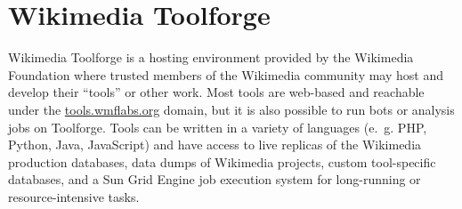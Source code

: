 \section{Wikimedia Toolforge}
\label{sec:Background:Toolforge}


Wikimedia Toolforge is a hosting environment provided by the Wikimedia Foundation
where trusted members of the Wikimedia community may host and develop their “tools” or other work.
Most tools are web-based and reachable under the \href{https://tools.wmflabs.org/}{tools.wmflabs.org} domain,
but it is also possible to run bots or analysis jobs on Toolforge.
Tools can be written in a variety of languages
(e.~g. PHP, Python, Java, JavaScript)
and have access to live replicas of the Wikimedia production databases,
data dumps of Wikimedia projects,
custom tool-specific databases,
and a Sun Grid Engine job execution system for long-running or resource-intensive tasks.

